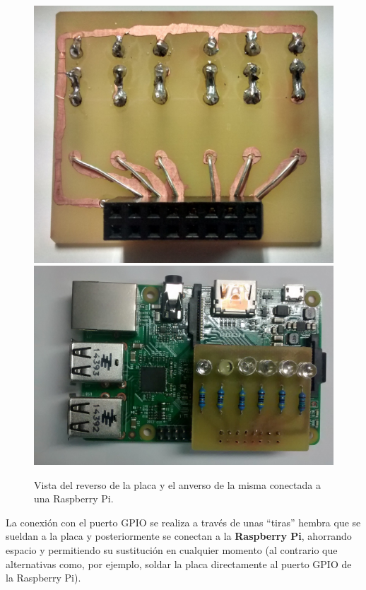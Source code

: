 \begin{figure}[H]
\centering
\includegraphics[height=0.2\textheight]{Chapters/Chapter5/Figures/estructuraFinal/pcb1}
\includegraphics[height=0.2\textheight]{Chapters/Chapter5/Figures/estructuraFinal/pcb2}
\caption{Vista del reverso de la placa y el anverso de la misma conectada a una Raspberry Pi.}
\end{figure}

La conexión con el puerto GPIO se realiza a través de unas ``tiras'' hembra que se sueldan a la placa y posteriormente se conectan a la \textbf{Raspberry Pi}, ahorrando espacio y permitiendo su sustitución en cualquier momento (al contrario que alternativas como, por ejemplo, soldar la placa directamente al puerto GPIO de la Raspberry Pi).

